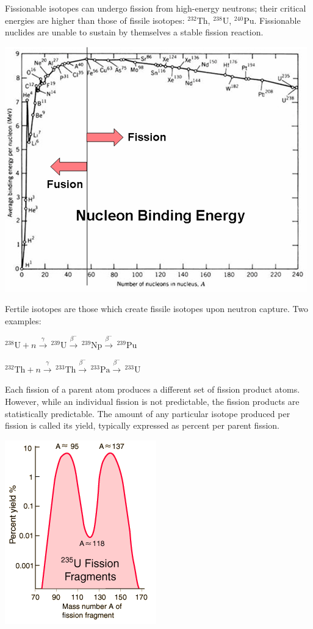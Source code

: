 \documentclass[12pt]{article}
\begin{document}
Fissionable isotopes can undergo fission from high-energy neutrons; their critical energies are higher than those of fissile isotopes: $^{232}$Th, $^{238}$U, $^{240}$Pu. Fissionable nuclides are unable to sustain by themselves a stable fission reaction.
\begin{center}
\includegraphics[scale=0.6]{../figs/nucleonbinding}
\end{center}

Fertile isotopes are those which create fissile isotopes upon neutron capture. Two examples:

$^{238}\text{U}+n \stackrel{\gamma}{\rightarrow} \, ^{239}\text{U}\stackrel{\beta^-}{\rightarrow} \, ^{239}\text{Np}\stackrel{\beta^-}{\rightarrow} \, ^{239}\text{Pu}$

$^{232}\text{Th}+n \stackrel{\gamma}{\rightarrow} \,^{233}\text{Th}\stackrel{\beta^-}{\rightarrow}\, ^{233}\text{Pa}\stackrel{\beta^-}{\rightarrow} \, ^{233}\text{U}$

Each fission of a parent atom produces a different set of fission product atoms. However, while an individual fission is not predictable, the fission products are statistically predictable. The amount of any particular isotope produced per fission is called its yield, typically expressed as percent per parent fission.
\begin{center}
\includegraphics[scale=0.6]{../figs/fissionproductyield}
\end{center}
\end{document}
